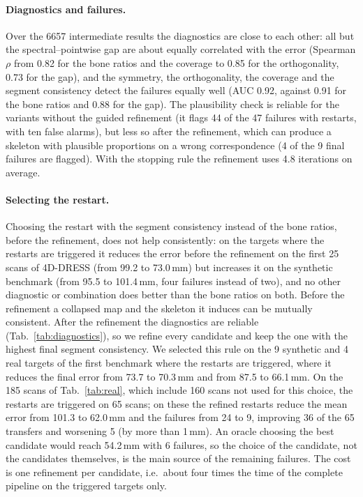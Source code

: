 \documentclass[11pt]{article}
\begin{document}
\paragraph{Diagnostics and failures.} Over the 6657 intermediate results the
diagnostics are close to each other: all but the spectral--pointwise gap are
about equally correlated with the error (Spearman $\rho$ from 0.82 for the
bone ratios and the coverage to 0.85 for the orthogonality, 0.73 for the gap),
and the symmetry, the orthogonality, the coverage and the segment consistency
detect the failures equally well (AUC 0.92, against 0.91 for the bone ratios
and 0.88 for the gap). The plausibility
check is reliable for the variants without the guided refinement (it flags
44 of the 47 failures with restarts, with ten false alarms), but less so
after the refinement, which can produce a skeleton with plausible
proportions on a wrong correspondence (4 of the 9 final failures are
flagged). With the stopping rule the refinement uses 4.8 iterations on
average.

\paragraph{Selecting the restart.} Choosing the restart with the segment
consistency instead of the bone ratios, before the refinement, does not help
consistently: on the targets where the restarts are triggered it reduces the
error before the refinement on the first 25 scans of 4D-DRESS (from 99.2 to
73.0\,mm) but increases it on the synthetic benchmark (from 95.5 to
101.4\,mm, four failures instead of two), and no other diagnostic or
combination does better than the bone ratios on both. Before the refinement a
collapsed map and the skeleton it induces can be mutually consistent. After
the refinement the diagnostics are reliable (Tab.~\ref{tab:diagnostics}), so
we refine every candidate and keep the one with the highest final segment
consistency. We selected this rule on the 9 synthetic and 4 real targets of
the first benchmark where the restarts are triggered, where it reduces the
final error from 73.7 to 70.3\,mm and from 87.5 to 66.1\,mm. On the 185 scans
of Tab.~\ref{tab:real}, which include 160 scans not used for this choice, the
restarts are triggered on 65 scans; on these the refined restarts reduce the
mean error from 101.3 to 62.0\,mm and the failures from 24 to 9, improving 36
of the 65 transfers and worsening 5 (by more than 1\,mm). An oracle choosing
the best candidate would reach 54.2\,mm with 6 failures, so the choice of the
candidate, not
the candidates themselves, is the main source of the remaining failures. The
cost is one refinement per candidate, i.e.\ about four times the time of the
complete pipeline on the triggered targets only.
\end{document}
